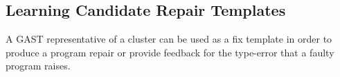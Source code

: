 



\subsection{Learning Candidate Repair Templates}
\label{sec:overview:learn}

A GAST representative of a cluster can be used as 
a fix template in order to produce a program repair 
or provide feedback for the type-error that a faulty 
program raises.

